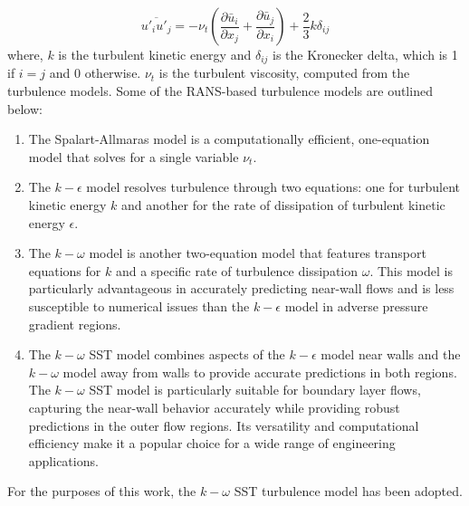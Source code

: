 \begin{equation}
\overline{u'_i u'_j} = - \nu_t \left( \frac{\partial \bar{u}_i}{\partial x_j} + \frac{\partial \bar{u}_j}{\partial x_i} \right) + \frac{2}{3} k \delta_{ij}
\end{equation}
where, $k$ is the turbulent kinetic energy and $\delta_{ij}$ is the Kronecker delta, which is 1 if $i = j$ and 0 otherwise. $\nu_t$ is the turbulent viscosity, computed from the turbulence models. Some of the RANS-based turbulence models are outlined below: 
\begin{enumerate}
  \item The Spalart-Allmaras model is a computationally efficient, one-equation model that solves for a single variable $\nu_t$.
  \item The $k-\epsilon$ model resolves turbulence through two equations: one for turbulent kinetic energy $k$ and another for the rate of dissipation of turbulent kinetic energy $\epsilon$. 
  \item The $k-\omega$ model is another two-equation model that features transport equations for $k$ and a specific rate of turbulence dissipation $\omega$. This model is particularly advantageous in accurately predicting near-wall flows and is less susceptible to numerical issues than the $k-\epsilon$ model in adverse pressure gradient regions. 
  \item The $k-\omega$  \gls{SST} model combines aspects of the $k-\epsilon$ model near walls and the $k-\omega$ model away from walls to provide accurate predictions in both regions. The $k-\omega$ SST model is particularly suitable for boundary layer flows, capturing the near-wall behavior accurately while providing robust predictions in the outer flow regions. Its versatility and computational efficiency make it a popular choice for a wide range of engineering applications.
\end{enumerate}
For the purposes of this work, the $k-\omega$ SST turbulence model has been adopted.
